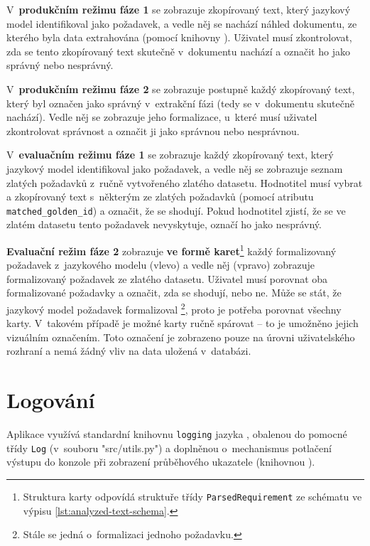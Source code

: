\documentclass[czech, bc, kiv, he, iso690numb, pdf]{fasthesis}
\begin{document}
V~\textbf{produkčním režimu fáze 1} se zobrazuje zkopírovaný text, který jazykový model identifikoval jako požadavek, a vedle něj se nachází náhled dokumentu, ze kterého byla data extrahována (pomocí knihovny  \cite{streamlit-pdf}). Uživatel musí zkontrolovat, zda se tento zkopírovaný text skutečně v~dokumentu nachází a označit ho jako správný nebo nesprávný.

V~\textbf{produkčním režimu fáze 2} se zobrazuje postupně každý zkopírovaný text, který byl označen jako správný v~extrakční fázi (tedy se v~dokumentu skutečně nachází). Vedle něj se zobrazuje jeho formalizace, u~které musí uživatel zkontrolovat správnost a označit ji jako správnou nebo nesprávnou.

V~\textbf{evaluačním režimu fáze 1} se zobrazuje každý zkopírovaný text, který jazykový model identifikoval jako požadavek, a vedle něj se zobrazuje seznam zlatých požadavků z~ručně vytvořeného zlatého datasetu. Hodnotitel musí vybrat a  zkopírovaný text s~některým ze zlatých požadavků (pomocí atributu \verb"matched_golden_id") a označit, že se shodují. Pokud hodnotitel zjistí, že se ve zlatém datasetu tento požadavek nevyskytuje, označí ho jako nesprávný.

\textbf{Evaluační režim fáze 2} zobrazuje \textbf{ve formě karet}\footnote{Struktura karty odpovídá struktuře třídy \verb"ParsedRequirement" ze schématu ve výpisu \ref{lst:analyzed-text-schema}.} každý formalizovaný požadavek z~jazykového modelu (vlevo) a vedle něj (vpravo) zobrazuje formalizovaný požadavek ze zlatého datasetu. Uživatel musí porovnat oba formalizované požadavky a označit, zda se shodují, nebo ne. Může se stát, že jazykový model požadavek formalizoval \footnote{Stále se jedná o~formalizaci jednoho požadavku.}, proto je potřeba porovnat všechny karty. V~takovém případě je možné karty ručně spárovat -- to je umožněno jejich vizuálním označením. Toto označení je zobrazeno pouze na úrovni uživatelského rozhraní a nemá žádný vliv na data uložená v~databázi.


\section{Logování}

Aplikace využívá standardní knihovnu \texttt{logging} jazyka , obalenou do pomocné třídy \texttt{Log} (v~souboru \filename"src/utils.py") a doplněnou o~mechanismus potlačení výstupu do konzole při zobrazení průběhového ukazatele (knihovnou  \cite{tqdm}).
\end{document}
